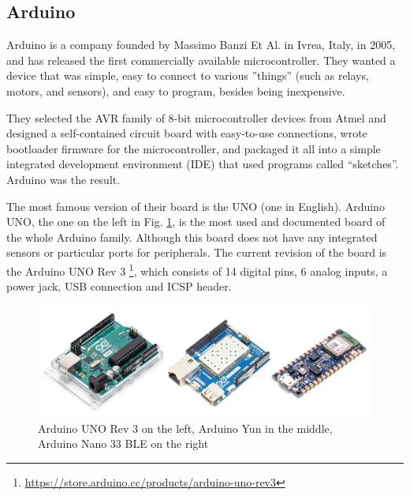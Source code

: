 	\subsection{Arduino}\label{subsec:arduino}
	
		Arduino is a company founded by Massimo Banzi Et Al. in Ivrea, Italy, in 2005, and has released the first commercially available microcontroller.
		They wanted a device that was simple, easy to connect to various ''things'' (such as relays, motors, and sensors), and easy to program, besides being inexpensive.
	
		They selected the AVR family of 8-bit microcontroller devices from Atmel and designed a self-contained circuit board with easy-to-use connections, wrote bootloader firmware for the microcontroller, and packaged it all into a simple integrated development environment (IDE) that used programs called “sketches”. 
		Arduino was the result.
		
		The most famous version of their board is the UNO (one in English).
		Arduino UNO, the one on the left in Fig. \ref{img:arduino_board}, is the most used and documented board of the whole Arduino family.
		Although this board does not have any integrated sensors or particular ports for peripherals.
		The current revision of the board is the Arduino UNO Rev 3 \footnote{\url{https://store.arduino.cc/products/arduino-uno-rev3}}, which consists of 14 digital pins, 6 analog inputs, a power jack, USB connection and ICSP header.
		
		\begin{figure}
			\centering
			\includegraphics[width=\textwidth]{resources/img/chap3/arduino_types}
			\caption{Arduino UNO Rev 3 on the left, Arduino Yun in the middle, Arduino Nano 33 BLE on the right}
			\label{img:arduino_board}
		\end{figure}
		
